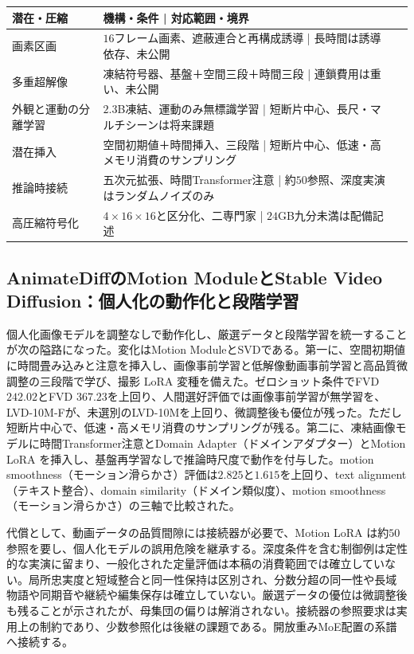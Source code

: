 \documentclass[lualatex,a4paper,10pt]{jlreq}
\begin{document}
\begin{center}
\small
\begin{tabularx}{\textwidth}{@{}p{}p{}X@{}}
\toprule
潜在・圧縮 & 機構・条件 | 対応範囲・境界 \\
\midrule
画素区画\autocite{btd070} & $16$フレーム画素、遮蔽連合と再構成誘導 | 長時間は誘導依存、未公開 \\
多重超解像\autocite{btd071} & 凍結符号器、基盤＋空間三段＋時間三段 | 連鎖費用は重い、未公開 \\
外観と運動の分離学習\autocite{btd073} & $2.3$B凍結、運動のみ無標識学習 | 短断片中心、長尺・マルチシーンは将来課題 \\
潜在挿入\autocite{btd075} & 空間初期値＋時間挿入、三段階 | 短断片中心、低速・高メモリ消費のサンプリング \\
推論時接続\autocite{btd074} & 五次元拡張、時間Transformer注意 | 約$50$参照、深度実演はランダムノイズのみ \\
高圧縮符号化\autocite{btd124} & $4 \times 16 \times 16$と区分化、二専門家 | $24$GB九分未満は配備記述 \\
\bottomrule
\end{tabularx}
\end{center}

\subsection{AnimateDiffのMotion ModuleとStable Video Diffusion：個人化の動作化と段階学習}
個人化画像モデルを調整なしで動作化し、厳選データと段階学習を統一することが次の隘路になった\autocite{btd075,btd074}。変化はMotion ModuleとSVDである\autocite{btd075,btd074}。第一に、空間初期値に時間畳み込みと注意を挿入し、画像事前学習と低解像動画事前学習と高品質微調整の三段階で学び、撮影 LoRA 変種を備えた\autocite{btd075}。ゼロショット条件でFVD $242.02$とFVD $367.23$を上回り、人間選好評価では画像事前学習が無学習を、LVD-10M-Fが、未選別のLVD-10Mを上回り、微調整後も優位が残った\autocite{btd075}。ただし短断片中心で、低速・高メモリ消費のサンプリングが残る\autocite{btd075}。第二に、凍結画像モデルに時間Transformer注意とDomain Adapter（ドメインアダプター）とMotion LoRA を挿入し、基盤再学習なしで推論時尺度で動作を付与した\autocite{btd074}。motion smoothness（モーション滑らかさ）評価は$2.825$と$1.615$を上回り、text alignment（テキスト整合）、domain similarity（ドメイン類似度）、motion smoothness（モーション滑らかさ）の三軸で比較された\autocite{btd074}。

代償として、動画データの品質間隙には接続器が必要で、Motion LoRA は約$50$参照を要し、個人化モデルの誤用危険を継承する\autocite{btd074}。深度条件を含む制御例は定性的な実演に留まり、一般化された定量評価は本稿の消費範囲では確立していない\autocite{btd074}。局所忠実度と短域整合と同一性保持は区別され、分数分超の同一性や長域物語や同期音や継続や編集保存は確立していない\autocite{btd074,btd075}。厳選データの優位は微調整後も残ることが示されたが、母集団の偏りは解消されない\autocite{btd075}。接続器の参照要求は実用上の制約であり、少数参照化は後継の課題である\autocite{btd074}。開放重みMoE配置の系譜へ接続する\autocite{btd074,btd075,btd124}。
\end{document}
